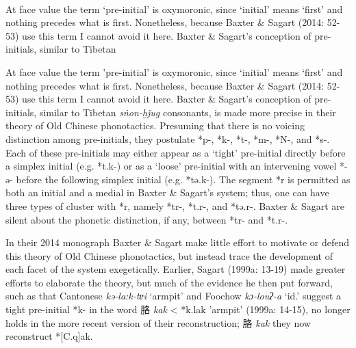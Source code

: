\paragraph{} At face value the term `pre-initial' is oxymoronic, since `initial'
means `first' and nothing precedes what is first. Nonetheless, because
Baxter \& Sagart (2014: 52-53) use this term I cannot avoid it here.
Baxter \& Sagart's conception of pre-initials, similar to Tibetan

At face value the term
'pre-initial' is oxymoronic, since `initial' means `first' and nothing
precedes what is first. Nonetheless, because Baxter \& Sagart (2014:
52-53) use this term I cannot avoid it here. Baxter \& Sagart's
conception of pre-initials, similar to Tibetan 
{}
\emph{sṅon-ḫǰug} consonants, is made more precise in their theory of Old
Chinese phonotactics. Presuming that there is no voicing distinction
among pre-initials, they postulate *p-, *k-, *t-, *m-, *N-, and *s-.
Each of these pre-initials may either appear as a `tight' pre-initial
directly before a simplex initial (e.g. *t.k-) or as a `loose'
pre-initial with an intervening vowel *-ə- before the following simplex
initial (e.g. *tə.k-). The segment *r is permitted as both an initial
and a medial in Baxter \& Sagart's system; thus, one can have three
types of cluster with *r, namely *tr-, *t.r-, and *tə.r-. Baxter \&
Sagart are silent about the phonetic distinction, if any, between *tr-
and *t.r-.

In their 2014 monograph Baxter \& Sagart make little effort to motivate
or defend this theory of Old Chinese phonotactics, but instead trace the
development of each facet of the system exe­ge­ti­cal­ly. Earlier,
Sagart (1999a: 13-19) made greater efforts to elaborate the theory, but
much of the evidence he then put forward, such as that Cantonese
 \emph{kə-la:k-tɐi} `armpit' and Foochow  \emph{kɔ-louʔ-a} `id.' suggest a
tight pre-initial *k- in the word 胳  \emph{kak} \textless{} *k.l{}ak
'armpit' (1999a: 14-15), no longer holds in the more recent version of
their reconstruction; 胳 \emph{kak} they now reconstruct *[C.q]{}ak.

